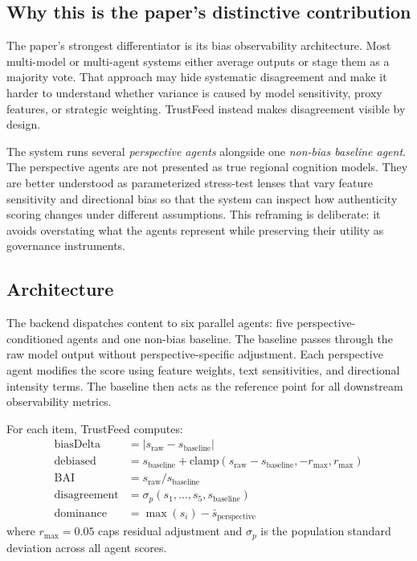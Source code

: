 \documentclass[acmlarge,screen,nonacm]{acmart}
\begin{document}
\subsection{Why this is the paper's distinctive contribution}

The paper's strongest differentiator is its bias observability architecture. Most multi-model or multi-agent systems either average outputs or stage them as a majority vote. That approach may hide systematic disagreement and make it harder to understand whether variance is caused by model sensitivity, proxy features, or strategic weighting. TrustFeed instead makes disagreement visible by design.

The system runs several \emph{perspective agents} alongside one \emph{non-bias baseline agent}. The perspective agents are not presented as true regional cognition models. They are better understood as parameterized stress-test lenses that vary feature sensitivity and directional bias so that the system can inspect how authenticity scoring changes under different assumptions. This reframing is deliberate: it avoids overstating what the agents represent while preserving their utility as governance instruments.

\subsection{Architecture}

The backend dispatches content to six parallel agents: five perspective-conditioned agents and one non-bias baseline. The baseline passes through the raw model output without perspective-specific adjustment. Each perspective agent modifies the score using feature weights, text sensitivities, and directional intensity terms. The baseline then acts as the reference point for all downstream observability metrics.

For each item, TrustFeed computes:
\begin{align}
\text{biasDelta} &= |s_{\text{raw}} - s_{\text{baseline}}| \\
\text{debiased} &= s_{\text{baseline}} + \text{clamp}(s_{\text{raw}} - s_{\text{baseline}}, -r_{\max}, r_{\max}) \\
\text{BAI} &= s_{\text{raw}} / s_{\text{baseline}} \\
\text{disagreement} &= \sigma_p(s_1, \ldots, s_5, s_{\text{baseline}}) \\
\text{dominance} &= \max(s_i) - \bar{s}_{\text{perspective}}
\end{align}
where $r_{\max}=0.05$ caps residual adjustment and $\sigma_p$ is the population standard deviation across all agent scores.
\end{document}
